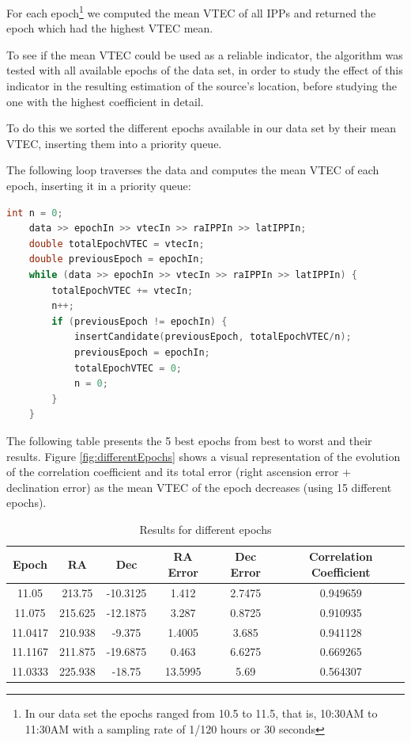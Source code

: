 For each epoch\footnote{In our data set the epochs ranged from 10.5 to 11.5, that is, 10:30AM to 11:30AM with a sampling rate of 1/120 hours or 30 seconds} we computed the mean VTEC of all IPPs and returned the epoch which had the highest VTEC mean.

To see if the mean VTEC could be used as a reliable indicator, the algorithm was tested with all available epochs of the data set, in order to study the effect of this indicator in the resulting estimation of the source's location, before studying the one with the highest coefficient in detail.

To do this we sorted the different epochs available in our data set by their mean VTEC, inserting them into a priority queue.

The following loop traverses the data and computes the mean VTEC of each epoch, inserting it in a priority queue:

\begin{minipage}{\linewidth}
	\begin{lstlisting}[language=c, caption=Finding a VTEC spike]
	int n = 0;
	data >> epochIn >> vtecIn >> raIPPIn >> latIPPIn;
	double totalEpochVTEC = vtecIn;
	double previousEpoch = epochIn;
	while (data >> epochIn >> vtecIn >> raIPPIn >> latIPPIn) {
		totalEpochVTEC += vtecIn;
		n++;
		if (previousEpoch != epochIn) {
			insertCandidate(previousEpoch, totalEpochVTEC/n);
			previousEpoch = epochIn;
			totalEpochVTEC = 0;
			n = 0;
		}
	}\end{lstlisting}
\end{minipage}

The following table presents the 5 best epochs from best to worst and their results. Figure \ref{fig:differentEpochs} shows a visual representation of the evolution of the correlation coefficient and its total error (right ascension error + declination error) as the mean VTEC of the epoch decreases (using 15 different epochs).

\begin{table}[h!]
	\centering
	\def\arraystretch{1.2}
	\begin{tabular}{|c c c c c c|} 
		\hline
		\textbf{Epoch} & RA & Dec & RA Error & Dec Error & Correlation Coefficient \\ [0.5ex] 
		\hline\hline
		11.05 & 213.75 & -10.3125 & 1.412 & 2.7475 & 0.949659 \\ 
		\hline
		11.075 & 215.625 & -12.1875 & 3.287 & 0.8725 & 0.910935 \\ 
		\hline
		11.0417 & 210.938 & -9.375 & 1.4005 & 3.685 & 0.941128 \\ 
		\hline
		11.1167 & 211.875 & -19.6875 & 0.463 & 6.6275 & 0.669265 \\ 
		\hline
		11.0333 & 225.938 & -18.75 & 13.5995 & 5.69 & 0.564307 \\  
		\hline
	\end{tabular}
	\caption{Results for different epochs}
\end{table}

